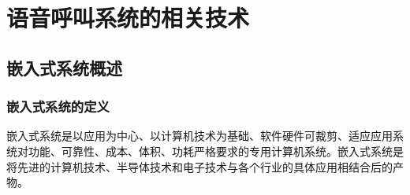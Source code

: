 
\chapter{语音呼叫系统的相关技术}

\section{嵌入式系统概述}
\subsection{嵌入式系统的定义}
嵌{\cf}入式{\cf}系统{\cf}是以{\cf}应用{\cf}为中{\cf}心、{\cf}以计{\cf}算机{\cf}技术{\cf}为基{\cf}础、{\cf}软件{\cf}硬件{\cf}可裁{\cf}剪、{\cf}适应{\cf}应用{\cf}系统{\cf}对功{\cf}能、{\cf}可靠{\cf}性、{\cf}成本{\cf}、体{\cf}积、{\cf}功耗{\cf}严格{\cf}要求{\cf}的专{\cf}用计{\cf}算机{\cf}系统{\cf}。嵌{\cf}入式{\cf}系统{\cf}是将{\cf}先进{\cf}的计{\cf}算机{\cf}技术{\cf}、半{\cf}导体{\cf}技术{\cf}和电{\cf}子技{\cf}术与{\cf}各个{\cf}行业{\cf}的具{\cf}体应{\cf}用相{\cf}结合{\cf}后的{\cf}产物。

